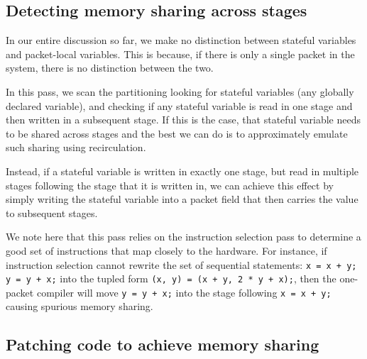 

\subsection{Detecting memory sharing across stages}
In our entire discussion so far, we make no distinction between stateful
variables and packet-local variables. This is because, if there is only a
single packet in the system, there is no distinction between the two.

In this pass, we scan the partitioning looking for stateful variables (any
globally declared variable), and checking if any stateful variable is read in
one stage and then written in a subsequent stage. If this is the case, that
stateful variable needs to be shared across stages and the best we can do is to
approximately emulate such sharing using recirculation.

Instead, if a stateful variable is written in exactly one stage, but read in
multiple stages following the stage that it is written in, we can achieve this
effect by simply writing the stateful variable into a packet field that then
carries the value to subsequent stages.

We note here that this pass relies on the instruction selection pass to
determine a good set of instructions that map closely to the hardware. For
instance, if instruction selection cannot rewrite the set of sequential
statements: \texttt{x = x + y; y = y + x;} into the tupled form \texttt{(x, y)
= (x + y, 2 * y + x);}, then the one-packet compiler will move \texttt{y = y +
x;} into the stage following \texttt{x = x + y;} causing spurious memory
sharing.

\subsection{Patching code to achieve memory sharing}

